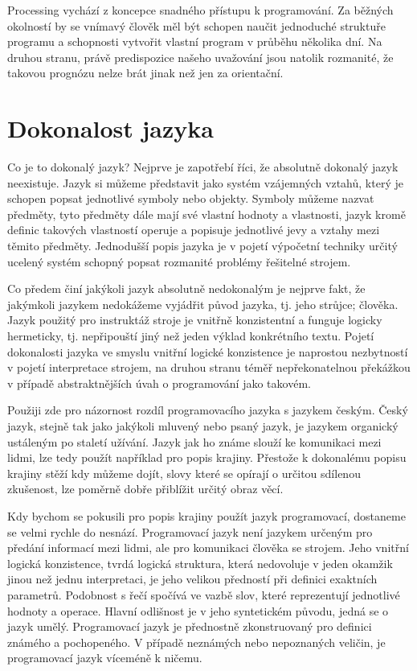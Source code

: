 \documentclass[10pt]{book}
\newcommand{\oddil}[1]{\section{#1}\index{#1}\label{#1}}
\begin{document}
Processing vychází z koncepce snadného přístupu k programování. Za běžných okolností by se vnímavý člověk měl být schopen naučit jednoduché struktuře programu a schopnosti vytvořit vlastní program v průběhu několika dní. Na druhou stranu, právě predispozice našeho uvažování jsou natolik rozmanité, že takovou prognózu nelze brát jinak než jen za orientační.




\oddil{Dokonalost jazyka}

Co je to dokonalý jazyk? Nejprve je zapotřebí říci, že absolutně dokonalý jazyk neexistuje. Jazyk si můžeme představit jako systém vzájemných vztahů, který je schopen popsat jednotlivé symboly nebo objekty. Symboly můžeme nazvat předměty, tyto předměty dále mají své vlastní hodnoty a vlastnosti, jazyk kromě definic takových vlastností operuje a popisuje jednotlivé jevy a vztahy mezi těmito předměty. Jednodušší popis jazyka je v pojetí výpočetní techniky určitý ucelený systém schopný popsat rozmanité problémy řešitelné strojem.

Co předem činí jakýkoli jazyk absolutně nedokonalým je nejprve fakt, že jakýmkoli jazykem nedokážeme vyjádřit původ jazyka, tj. jeho strůjce; člověka. Jazyk použitý pro instruktáž stroje je vnitřně konzistentní a funguje logicky hermeticky, tj. nepřipouští jiný než jeden výklad konkrétního textu. Pojetí dokonalosti jazyka ve smyslu vnitřní logické konzistence je naprostou nezbytností v pojetí interpretace strojem, na druhou stranu téměř nepřekonatelnou překážkou v případě abstraktnějších úvah o programování jako takovém.

Použiji zde pro názornost rozdíl programovacího jazyka s jazykem českým. Český jazyk, stejně tak jako jakýkoli mluvený nebo psaný jazyk, je jazykem organický ustáleným po staletí užívání. Jazyk jak ho známe slouží ke komunikaci mezi lidmi, lze tedy použít například pro popis krajiny. Přestože k dokonalému popisu krajiny stěží kdy můžeme dojít, slovy které se opírají o určitou sdílenou zkušenost, lze poměrně dobře přiblížit určitý obraz věcí.

Kdy bychom se pokusili pro popis krajiny použít jazyk programovací, dostaneme se velmi rychle do nesnází. Programovací jazyk není jazykem určeným pro předání informací mezi lidmi, ale pro komunikaci člověka se strojem. Jeho vnitřní logická konzistence, tvrdá logická struktura, která nedovoluje v jeden okamžik jinou než jednu interpretaci, je jeho velikou předností při definici exaktních parametrů. Podobnost s řečí spočívá ve vazbě slov, které reprezentují jednotlivé hodnoty a operace. Hlavní odlišnost je v jeho syntetickém původu, jedná se o jazyk umělý. Programovací jazyk je přednostně zkonstruovaný pro definici známého a pochopeného. V případě neznámých nebo nepoznaných veličin, je programovací jazyk víceméně k ničemu. 
\end{document}
